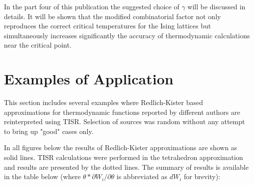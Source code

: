 \documentclass[12pt,abstract]{scrartcl}
\begin{document}
In the part four of this publication \cite{TISR_p4} the suggested  choice of $\gamma$ will be discussed in details. It will be shown that 
the  modified combinatorial factor not only reproduces the correct critical temperatures for the Ising lattices but simultaneously  increases significantly the accuracy of thermodynamic calculations near the critical point.  

\section{Examples of Application}

This section includes several examples where Redlich-Kister based approximations \cite{Redlich1949} for thermodynamic functions reported by different authors are reinterpreted using TISR. Selection of sources was  random without any attempt to bring up  "good" cases only. 

In  all figures below the results of Redlich-Kister approximations are shown as solid lines. TISR calculations were performed in the tetrahedron approximation and results are presented by the dotted lines. The summary of results is available  in the table below (where $\theta * {\partial W_i}/{\partial \theta}$ is abbreviated as $dW_i$ for brevity):
\end{document}
